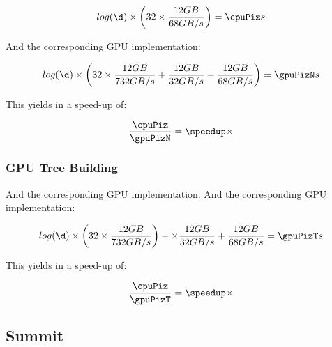 \documentclass[]{article}
\begin{document}
\begin{center}
	\begin{equation}
		log(\d) \times \left ( \p \times \frac{ \s GB }{68 GB/s} \right )  = \cpuPiz s
	\end{equation}
\end{center}


And the corresponding GPU implementation:
\pgfmathsetmacro{}
\begin{center}
	\begin{equation}
		log(\d) \times \left ( 32 \times \frac{12 GB}{732 GB/s} + \frac{12 GB}{32 GB/s}  + \frac{12 GB}{68 GB/s} \right )=  \gpuPizN s
	\end{equation}
\end{center}

This yields in a speed-up of:
\pgfmathsetmacro\speedup{\cpuPiz / \gpuPizN}
\begin{center}
	\begin{equation}
		\frac{\cpuPiz}{\gpuPizN} = \speedup \times
	\end{equation}
\end{center}


\subsubsection{GPU Tree Building}

And the corresponding GPU implementation:
\pgfmathsetmacro{}
And the corresponding GPU implementation:
\begin{center}
	\begin{equation}
		log(\d) \times \left ( \p \times \frac{\s GB}{732 GB/s} \right ) + \times \frac{\s GB}{32 GB/s}  + \frac{\s GB}{68 GB/s} = \gpuPizT s
	\end{equation}
\end{center}

This yields in a speed-up of:
\pgfmathsetmacro\speedup{\cpuPiz / \gpuPizT}
\begin{center}
	\begin{equation}
		\frac{\cpuPiz}{\gpuPizT} = \speedup \times
	\end{equation}
\end{center}

\vspace{5mm}


\subsection{Summit}
\end{document}
